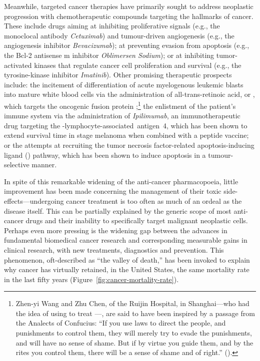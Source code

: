 Meanwhile, targeted cancer therapies have primarily sought to address neoplastic
progression with chemotherapeutic compounds targeting the hallmarks of
cancer.\cite{hanahan_hallmarks_2011} These include drugs aiming at inhibiting
proliferative signals (e.g., the monoclocal antibody \emph{Cetuximab}) and
tumour-driven angiogenesis (e.g., the angiogenesis inhibitor
\emph{Bevacizumab}); at preventing evasion from apoptosis (e.g., the Bcl-2
antisense m inhibitor \emph{Oblimersen Sodium}); or at inhibiting
tumor-activated kinases that regulate cancer cell proliferation and survival
(e.g., the tyrosine-kinase inhibitor \emph{Imatinib}).\cite{pavet_towards_2011}
Other promising therapeutic prospects include: the incitement of differentiation
of acute myelogenous leukemic blasts into mature white blood cells via the
administration of all-trans-retinoic acid, or , which targets
the oncogenic fusion protein
\mbox{};\footnote{Zhen-yi Wang and Zhu Chen, of the
  Ruijin Hospital, in Shanghai---who had the idea of using  to
  treat ---, are said to have been inspired by a passage from the
  Analects of Confucius: ``If you use laws to direct the people, and punishments
  to control them, they will merely try to evade the punishments, and will have
  no sense of shame. But if by virtue you guide them, and by the rites you
  control them, there will be a sense of shame and of right.''
  (\citealp{groopman_is_2014}).} the enlistment of the patient's immune system
via the administration of \emph{Ipilimumab}, an immunotherapeutic drug targeting
the \mbox{-lymphocyte-associated antigen 4}, which has been shown
to extend survival time in stage  melanoma when combined with a
peptide vaccine;\cite{hodi_improved_2010} or the attempts at recruiting the
tumor necrosis factor-related apoptosis-inducing ligand ()
pathway, which has been shown to induce apoptosis in a tumour-selective
manner.\cite{ma_novel_2009}

In spite of this remarkable widening of the anti-cancer pharmacopoeia, little
improvement has been made concerning the management of their toxic
side-effects---undergoing cancer treatment is too often as much of an ordeal as
the disease itself.\cite{cleeland_reducing_2012} This can be partially explained
by the generic scope of most anti-cancer drugs and their inability to
specifically target malignant neoplastic cells.  Perhaps even more pressing is
the widening gap between the advances in fundamental biomedical cancer research
and corresponding measurable gains in clinical research, with new treatments,
diagnostics and prevention.  This phenomenon, oft-described as ``the valley of
death,''\cite{butler_translational_2008} has been invoked to explain why cancer
has virtually retained, in the United States, the same mortality rate in the
last fifty years (Figure~\ref{fig:cancer-mortality-rate}).

